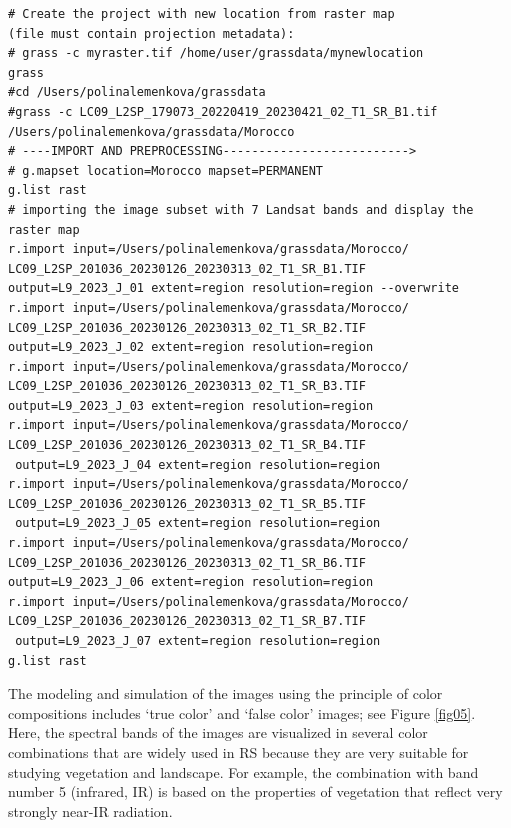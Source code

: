 \documentclass[geomatics,article,accept,pdftex,oneauthor]{Definitions/mdpi}
\begin{document}
\begin{footnotesize}
\begin{verbatim}
# Create the project with new location from raster map 
(file must contain projection metadata):
# grass -c myraster.tif /home/user/grassdata/mynewlocation
grass
#cd /Users/polinalemenkova/grassdata
#grass -c LC09_L2SP_179073_20220419_20230421_02_T1_SR_B1.tif 
/Users/polinalemenkova/grassdata/Morocco
# ----IMPORT AND PREPROCESSING-------------------------->
# g.mapset location=Morocco mapset=PERMANENT
g.list rast
# importing the image subset with 7 Landsat bands and display the raster map
r.import input=/Users/polinalemenkova/grassdata/Morocco/
LC09_L2SP_201036_20230126_20230313_02_T1_SR_B1.TIF 
output=L9_2023_J_01 extent=region resolution=region --overwrite
r.import input=/Users/polinalemenkova/grassdata/Morocco/
LC09_L2SP_201036_20230126_20230313_02_T1_SR_B2.TIF 
output=L9_2023_J_02 extent=region resolution=region
r.import input=/Users/polinalemenkova/grassdata/Morocco/
LC09_L2SP_201036_20230126_20230313_02_T1_SR_B3.TIF 
output=L9_2023_J_03 extent=region resolution=region
r.import input=/Users/polinalemenkova/grassdata/Morocco/
LC09_L2SP_201036_20230126_20230313_02_T1_SR_B4.TIF
 output=L9_2023_J_04 extent=region resolution=region
r.import input=/Users/polinalemenkova/grassdata/Morocco/
LC09_L2SP_201036_20230126_20230313_02_T1_SR_B5.TIF
 output=L9_2023_J_05 extent=region resolution=region
r.import input=/Users/polinalemenkova/grassdata/Morocco/
LC09_L2SP_201036_20230126_20230313_02_T1_SR_B6.TIF 
output=L9_2023_J_06 extent=region resolution=region
r.import input=/Users/polinalemenkova/grassdata/Morocco/
LC09_L2SP_201036_20230126_20230313_02_T1_SR_B7.TIF
 output=L9_2023_J_07 extent=region resolution=region
g.list rast
\end{verbatim}
\end{footnotesize}

The modeling and simulation of the images using the principle of color compositions includes `true color' and `false color' images; see Figure \ref{fig05}. Here, the spectral bands of the images are visualized in several color combinations that are widely used in RS because they are very suitable for studying vegetation and landscape. For example, the combination with band number 5 (infrared, IR) is based on the properties of vegetation that reflect very strongly near-IR radiation.
\end{document}
